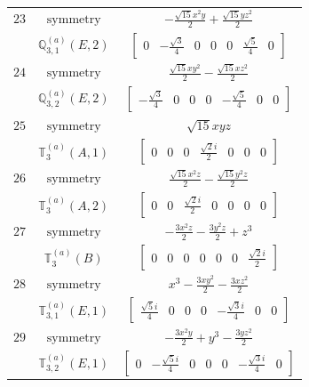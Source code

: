 \documentclass[fleqn,8pt,landscape]{jsarticle}
\begin{document}
\begin{longtable}{ccc}
$ 23 $ & $ \text{symmetry} $ & $ - \frac{\sqrt{15} x^{2} y}{2} + \frac{\sqrt{15} y z^{2}}{2} $ \\
$  $ & $ \mathbb{Q}_{3,1}^{(a)}(E,2) $ & $ \begin{bmatrix} 0 & - \frac{\sqrt{3}}{4} & 0 & 0 & 0 & \frac{\sqrt{5}}{4} & 0 \end{bmatrix} $ \\ \hline
$ 24 $ & $ \text{symmetry} $ & $ \frac{\sqrt{15} x y^{2}}{2} - \frac{\sqrt{15} x z^{2}}{2} $ \\
$  $ & $ \mathbb{Q}_{3,2}^{(a)}(E,2) $ & $ \begin{bmatrix} - \frac{\sqrt{3}}{4} & 0 & 0 & 0 & - \frac{\sqrt{5}}{4} & 0 & 0 \end{bmatrix} $ \\ \hline
$ 25 $ & $ \text{symmetry} $ & $ \sqrt{15} x y z $ \\
$  $ & $ \mathbb{T}_{3}^{(a)}(A,1) $ & $ \begin{bmatrix} 0 & 0 & 0 & \frac{\sqrt{2} i}{2} & 0 & 0 & 0 \end{bmatrix} $ \\ \hline
$ 26 $ & $ \text{symmetry} $ & $ \frac{\sqrt{15} x^{2} z}{2} - \frac{\sqrt{15} y^{2} z}{2} $ \\
$  $ & $ \mathbb{T}_{3}^{(a)}(A,2) $ & $ \begin{bmatrix} 0 & 0 & \frac{\sqrt{2} i}{2} & 0 & 0 & 0 & 0 \end{bmatrix} $ \\ \hline
$ 27 $ & $ \text{symmetry} $ & $ - \frac{3 x^{2} z}{2} - \frac{3 y^{2} z}{2} + z^{3} $ \\
$  $ & $ \mathbb{T}_{3}^{(a)}(B) $ & $ \begin{bmatrix} 0 & 0 & 0 & 0 & 0 & 0 & \frac{\sqrt{2} i}{2} \end{bmatrix} $ \\ \hline
$ 28 $ & $ \text{symmetry} $ & $ x^{3} - \frac{3 x y^{2}}{2} - \frac{3 x z^{2}}{2} $ \\
$  $ & $ \mathbb{T}_{3,1}^{(a)}(E,1) $ & $ \begin{bmatrix} \frac{\sqrt{5} i}{4} & 0 & 0 & 0 & - \frac{\sqrt{3} i}{4} & 0 & 0 \end{bmatrix} $ \\ \hline
$ 29 $ & $ \text{symmetry} $ & $ - \frac{3 x^{2} y}{2} + y^{3} - \frac{3 y z^{2}}{2} $ \\
$  $ & $ \mathbb{T}_{3,2}^{(a)}(E,1) $ & $ \begin{bmatrix} 0 & - \frac{\sqrt{5} i}{4} & 0 & 0 & 0 & - \frac{\sqrt{3} i}{4} & 0 \end{bmatrix} $ \\ \hline

\end{longtable}
\end{document}
